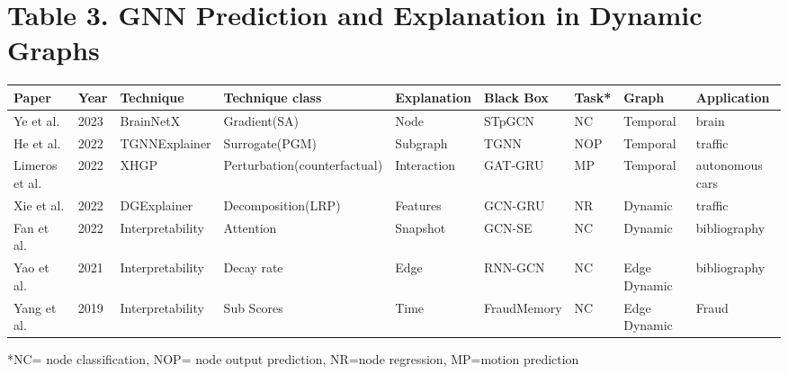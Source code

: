 \section{Table 3. GNN Prediction and Explanation in Dynamic Graphs}
\begin{table}
    \centering
    \begin{tabular}{|l|l|l|l|l|l|l|l|l|}
        \hline
        Paper & Year & Technique & Technique class & Explanation & Black Box & Task* & Graph & Application \\ \hline
        Ye et al.\cite{ye_explainable_2023} & 2023 & BrainNetX & Gradient(SA) & Node & STpGCN & NC & Temporal & brain \\
        He et al.\cite{he_explainer_2022} & 2022 & TGNNExplainer & Surrogate(PGM) & Subgraph & TGNN & NOP & Temporal & traffic \\
        Limeros et al.\cite{limeros_towards_2022} & 2022 & XHGP & Perturbation(counterfactual) & Interaction & GAT-GRU & MP & Temporal & autonomous cars \\
        Xie et al.\cite{xie_explaining_2022} & 2022 & DGExplainer & Decomposition(LRP) & Features & GCN-GRU & NR & Dynamic & traffic \\
        Fan et al.\cite{fan_gcn-se_2021} & 2022 & Interpretability & Attention & Snapshot & GCN-SE & NC & Dynamic & bibliography \\
        Yao et al.\cite{yao_interpretable_2021} & 2021 & Interpretability & Decay rate & Edge & RNN-GCN & NC & Edge Dynamic& bibliography \\
        Yang et al.\cite{yang_fraudmemory_2019} & 2019 & Interpretability & Sub Scores & Time & FraudMemory & NC & Edge Dynamic & Fraud \\
        \hline
    \end{tabular}
    *NC= node classification, NOP= node output prediction, NR=node regression, MP=motion prediction
    \label{table-3-full}
\end{table}
